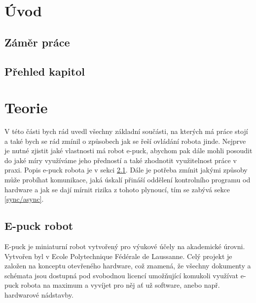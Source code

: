 \documentclass[12pt,notitlepage]{report}
\begin{document}
\newpage

\chapter{Úvod} %

    \section{Záměr práce}

    \section{Přehled kapitol}

\chapter{Teorie} %

    V této části bych rád uvedl všechny základní součásti, na kterých má práce
    stojí a také bych se rád zmínil o způsobech jak se řeší ovládání robota
    jinde. Nejprve je nutné zjistit jaké vlastnosti má robot e-puck, abychom
    pak dále mohli posoudit do jaké míry využíváme jeho předností a také
    zhodnotit využitelnost práce v praxi. Popis e-puck robota je v sekci
    \ref{e-puck robot}. Dále je potřeba zmínit jakými způsoby může probíhat
    komunikace, jaká úskalí přináší oddělení kontrolního programu od hardware a
    jak se dají mírnit rizika z tohoto plynoucí, tím se zabývá sekce
    \ref{sync/async}.

    \section{E-puck robot}
    \label{e-puck robot}
    E-puck je miniaturní robot vytvořený pro výukové účely na akademické
    úrovni. Vytvořen byl v Ecole Polytechnique Fédérale de Laussanne. Celý
    projekt je založen na konceptu otevřeného hardware, což znamená, že všechny
    dokumenty a schémata jsou dostupná pod svobodnou licencí umožňující
    komukoli využívat e-puck robota na maximum a vyvíjet pro něj ať už
    software, anebo např. hardwarové nádstavby.
\end{document}
